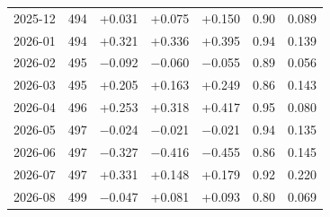 \begin{tabular}{lrrrrrr}
2025-12 & 494 & +0.031 & +0.075 & +0.150 & 0.90 & 0.089 \\
2026-01 & 494 & +0.321 & +0.336 & +0.395 & 0.94 & 0.139 \\
2026-02 & 495 & \ensuremath{-}0.092 & \ensuremath{-}0.060 & \ensuremath{-}0.055 & 0.89 & 0.056 \\
2026-03 & 495 & +0.205 & +0.163 & +0.249 & 0.86 & 0.143 \\
2026-04 & 496 & +0.253 & +0.318 & +0.417 & 0.95 & 0.080 \\
2026-05 & 497 & \ensuremath{-}0.024 & \ensuremath{-}0.021 & \ensuremath{-}0.021 & 0.94 & 0.135 \\
2026-06 & 497 & \ensuremath{-}0.327 & \ensuremath{-}0.416 & \ensuremath{-}0.455 & 0.86 & 0.145 \\
2026-07 & 497 & +0.331 & +0.148 & +0.179 & 0.92 & 0.220 \\
2026-08 & 499 & \ensuremath{-}0.047 & +0.081 & +0.093 & 0.80 & 0.069 \\
\bottomrule
\end{tabular}
